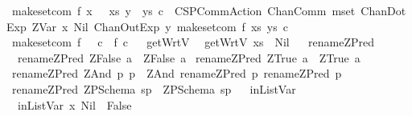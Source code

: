 \begin{isabellebody}
{\isacharbar}\ {\isachardoublequoteopen}make{\isacharunderscore}set{\isacharunderscore}com\ f\ {\isacharparenleft}{\isacharparenleft}x{\isacharcomma}\ {\isacharunderscore}{\isacharparenright}\ {\isacharhash}\ xs{\isacharparenright}\ {\isacharparenleft}y\ {\isacharhash}\ ys{\isacharparenright}\ c\ {\isacharequal}\ {\isacharparenleft}CSPCommAction\ {\isacharparenleft}ChanComm\ {\isacharprime}{\isacharprime}mset{\isacharprime}{\isacharprime}\ {\isacharbrackleft}ChanDotExp\ {\isacharparenleft}ZVar\ {\isacharparenleft}x{\isacharcomma}\ Nil{\isacharparenright}{\isacharparenright}{\isacharcomma}\ ChanOutExp\ y{\isacharbrackright}{\isacharparenright}\ {\isacharparenleft}make{\isacharunderscore}set{\isacharunderscore}com\ f\ xs\ ys\ c{\isacharparenright}{\isacharparenright}{\isachardoublequoteclose}\isanewline
{\isacharbar}\ {\isachardoublequoteopen}make{\isacharunderscore}set{\isacharunderscore}com\ f\ {\isacharunderscore}\ {\isacharunderscore}\ c\ {\isacharequal}\ {\isacharparenleft}f\ c{\isacharparenright}{\isachardoublequoteclose}\isanewline
\ \isanewline
{}\isamarkupfalse%
\ getWrtV\isanewline
{}\isanewline
\ \ {\isachardoublequoteopen}getWrtV\ xs\ {\isacharequal}\ Nil{\isachardoublequoteclose}\isanewline
\isanewline
\ \isanewline
{}\isamarkupfalse%
\ rename{\isacharunderscore}ZPred\isanewline
{}\isanewline
\ \ {\isachardoublequoteopen}rename{\isacharunderscore}ZPred\ {\isacharparenleft}ZFalse\ a{\isacharparenright}\ {\isacharequal}\ {\isacharparenleft}ZFalse\ a{\isacharparenright}{\isachardoublequoteclose}\isanewline
{\isacharbar}\ {\isachardoublequoteopen}rename{\isacharunderscore}ZPred\ {\isacharparenleft}ZTrue\ a{\isacharparenright}\ {\isacharequal}\ {\isacharparenleft}ZTrue\ a{\isacharparenright}{\isachardoublequoteclose}\isanewline
{\isacharbar}\ {\isachardoublequoteopen}rename{\isacharunderscore}ZPred\ {\isacharparenleft}ZAnd\ p{}\ p{}{\isacharparenright}\ {\isacharequal}\ {\isacharparenleft}ZAnd\ {\isacharparenleft}rename{\isacharunderscore}ZPred\ p{}{\isacharparenright}\ {\isacharparenleft}rename{\isacharunderscore}ZPred\ p{}{\isacharparenright}{\isacharparenright}{\isachardoublequoteclose}\isanewline
{\isacharbar}\ {\isachardoublequoteopen}rename{\isacharunderscore}ZPred\ {\isacharparenleft}ZPSchema\ sp{\isacharparenright}\ {\isacharequal}\ {\isacharparenleft}ZPSchema\ sp{\isacharparenright}{\isachardoublequoteclose}\isanewline
\isanewline
\ \isanewline
{}\isamarkupfalse%
\ inListVar\isanewline
{}\isanewline
\ \ {\isachardoublequoteopen}inListVar\ x\ Nil\ {\isacharequal}\ False{\isachardoublequoteclose}\isanewline

\end{isabellebody}
